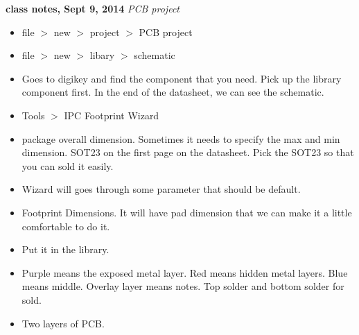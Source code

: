 \documentclass[]{article}
\begin{document}
\noindent \textbf{class notes, Sept 9, 2014}
\textit{PCB project}
\indent		\begin{itemize}

            \item   file $>$ new $>$ project $>$ PCB project
            \item   file $>$ new $>$ libary $>$ schematic 
            \item   Goes to digikey and find the component that you need. Pick up the library component first.
                    In the end of the datasheet, we can see the schematic.
            \item   Tools $>$  IPC Footprint Wizard
            \item   package overall dimension. Sometimes it needs to specify the max and min dimension. SOT23 on the first page on the datasheet.
                    Pick the SOT23 so that you can sold it easily.
            \item   Wizard will goes through some parameter that should be default. 
            \item   Footprint Dimensions. It will have pad dimension that we can make it a little comfortable to do it.
            \item   Put it in the library.

            \item   Purple means the exposed metal layer. Red means hidden metal layers. Blue means middle. Overlay layer means notes.
                    Top solder and bottom solder for sold.
            \item   Two layers of PCB.


\end{itemize}
\end{document}
